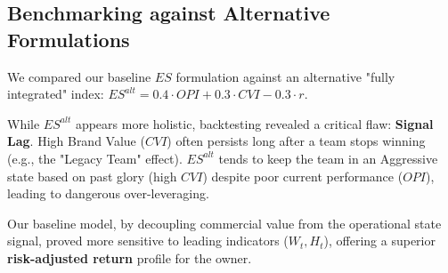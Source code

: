 \documentclass{mcmthesis}
\begin{document}
\subsection{Benchmarking against Alternative Formulations}
We compared our baseline $ES$ formulation against an alternative "fully integrated" index: $ES^{alt} = 0.4 \cdot OPI + 0.3 \cdot CVI - 0.3 \cdot r$.

While $ES^{alt}$ appears more holistic, backtesting revealed a critical flaw: \textbf{Signal Lag}. High Brand Value ($CVI$) often persists long after a team stops winning (e.g., the "Legacy Team" effect). $ES^{alt}$ tends to keep the team in an Aggressive state based on past glory (high $CVI$) despite poor current performance ($OPI$), leading to dangerous over-leveraging.

Our baseline model, by decoupling commercial value from the operational state signal, proved more sensitive to leading indicators ($W_t, H_t$), offering a superior \textbf{risk-adjusted return} profile for the owner.





\end{document}
